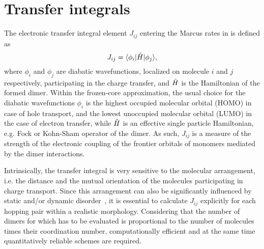 \section{Transfer integrals }
\label{sec:transfer_integrals}

The electronic transfer integral element $J_{ij}$ entering the Marcus rates in 
 is defined as
\begin{equation}
   J_{ij} = {\langle \phi_i \vert} \hat{H} {\vert \phi_j \rangle},
\label{equ:TI}
\end{equation}
where $\phi_i$ and $\phi_j$ are diabatic wavefunctions, localized on molecule 
$i$ and $j$ respectively, participating in the charge transfer, and $\hat{H}$ is 
the Hamiltonian of the formed dimer. Within the frozen-core approximation, the 
usual choice for the diabatic wavefunctions $\phi_i$ is 
the highest occupied molecular orbital (HOMO) in case of hole transport, and the 
lowest unoccupied molecular orbital (LUMO) in the case of electron transfer, 
while $\hat{H}$ is an effective single particle Hamiltonian, e.g. Fock or 
Kohn-Sham operator of the dimer. As such, $J_{ij}$ is a measure of the strength 
of the electronic coupling of the frontier orbitals of monomers mediated by the 
dimer interactions. 

Intrinsically, the transfer integral is very sensitive to the molecular 
arrangement, i.e. the distance and the mutual orientation of the molecules 
participating in charge transport. Since this arrangement can also be 
significantly influenced by static and/or dynamic 
disorder~\cite{baessler_charge_1993,troisi_charge-transport_2006,
troisi_charge_2009,mcmahon_organic_2010,vehoff_charge_2010},
it is essential to calculate $J_{ij}$ explicitly for each hopping pair within a 
realistic morphology. Considering that the number of dimers for which  
has to be evaluated is proportional to the number of molecules times their 
coordination number, computationally efficient and at the same time 
quantitatively reliable schemes are required.






